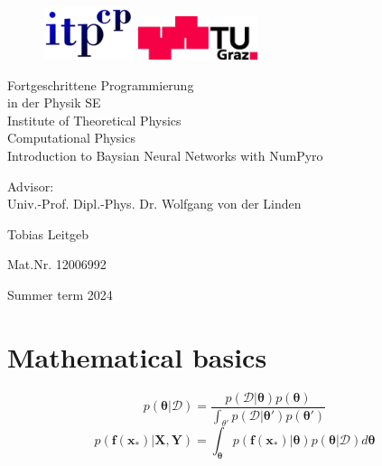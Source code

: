 \documentclass{article}
\newcommand{\bacc}{ Fortgeschrittene Programmierung \\ in der Physik SE}
\begin{document}
\begin{titlepage}
    \begin{figure}
    \includegraphics[width=3.cm]{logo-itp.png} \hfill
    \includegraphics[width=3.5cm]{logo-tu.png} \par
    \end{figure}
    
    \begin{center}
    {\huge\sc \bacc} \\ Institute of Theoretical Physics\\
    Computational Physics\\
    
    \vspace{5cm}
    {\huge\sc Introduction to Baysian Neural Networks with NumPyro} \par
    Advisor: \\ Univ.-Prof. Dipl.-Phys. Dr. Wolfgang von der Linden \\ 
    \vspace{5cm}
    
    {\Large\sc Tobias Leitgeb}
    
    {Mat.Nr. 12006992}
    
    \vspace{3cm}
    Summer term 2024
    \end{center}
    \end{titlepage}

\section{Mathematical basics}
\begin{equation}
    p(\bm \theta|\mathcal{D}) = \frac{p(\mathcal{D}|\bm \theta)p(\bm \theta)}{\int_{\theta'}p(\mathcal{D}|\bm \theta')p(\bm \theta')}
\end{equation}
\begin{equation}
    p(\bm f( \bm x_*) |\bm X, \bm Y ) = \int_{\bm \theta} p(\bm f ({\bm x_*})|\bm \theta ) p(\bm \theta | \mathcal{D})d \bm \theta
\end{equation}
\end{document}
